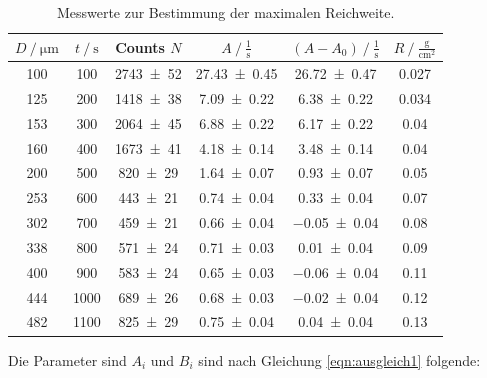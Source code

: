 \begin{table}[H]
  \centering
  \caption{Messwerte zur Bestimmung der maximalen Reichweite.}
  \label{tab:reichweite}
  \begin{tabular}{c c c c c c}
    \toprule
$D\:/\:\si{\micro\meter}$ & $t\:/\:\si{\second}$ & Counts $N$ & $A\:/\:\frac{1}{\si{\second}}$ & $(A-A_0)\:/\:\frac{1}{\si{\second}}$ &
$R\:/\:\frac{\si{\gram}}{\si{\centi\meter\squared}}$ \\
    \midrule
100 & 100  & \num{2743 +- 52} & \num{27.43 +- 0.45} & \num{26.72 +- 0.47} & \num{0.027} \\
125 & 200  & \num{1418 +- 38} & \num{7.09 +- 0.22}  & \num{6.38 +- 0.22} & \num{0.034} \\
153 & 300  & \num{2064 +- 45} & \num{6.88 +- 0.22}  & \num{6.17 +- 0.22} & \num{0.04} \\
160 & 400  & \num{1673 +- 41} & \num{4.18 +- 0.14}  & \num{3.48 +- 0.14} & \num{0.04} \\
200 & 500  & \num{820 +- 29}  & \num{1.64 +- 0.07}  & \num{0.93 +- 0.07} & \num{0.05} \\
253 & 600  & \num{443 +- 21}  & \num{0.74 +- 0.04}  & \num{0.33 +- 0.04} & \num{0.07} \\
302 & 700  & \num{459 +- 21}  & \num{0.66 +- 0.04}  & \num{-0.05 +- 0.04} & \num{0.08} \\
338 & 800  & \num{571 +- 24}  & \num{0.71 +- 0.03}  & \num{0.01 +- 0.04} & \num{0.09} \\
400 & 900  & \num{583 +- 24}  & \num{0.65 +- 0.03}  & \num{-0.06 +- 0.04} & \num{0.11} \\
444 & 1000 & \num{689 +- 26}  & \num{0.68 +- 0.03}  & \num{-0.02 +- 0.04} & \num{0.12} \\
482 & 1100 & \num{825 +- 29}  & \num{0.75 +- 0.04}  & \num{0.04 +- 0.04} & \num{0.13} \\
    \bottomrule
  \end{tabular}
\end{table}
\noindent Die Parameter sind $A_i$ und $B_i$ sind nach Gleichung \eqref{eqn:ausgleich1} folgende:
